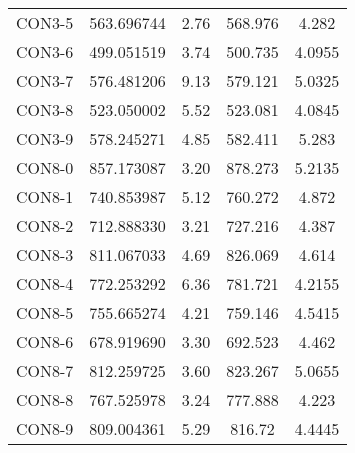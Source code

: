 \begin{table}[ht]
\begin{tabular}{c c c c c}
CON3-5 & 563.696744 & 2.76 & 568.976 & 4.282 \\
CON3-6 & 499.051519 & 3.74 & 500.735 & 4.0955 \\
CON3-7 & 576.481206 & 9.13 & 579.121 & 5.0325 \\
CON3-8 & 523.050002 & 5.52 & 523.081 & 4.0845 \\
CON3-9 & 578.245271 & 4.85 & 582.411 & 5.283 \\
CON8-0 & 857.173087 & 3.20 & 878.273 & 5.2135 \\
CON8-1 & 740.853987 & 5.12 & 760.272 & 4.872 \\
CON8-2 & 712.888330 & 3.21 & 727.216 & 4.387 \\
CON8-3 & 811.067033 & 4.69 & 826.069 & 4.614 \\
CON8-4 & 772.253292 & 6.36 & 781.721 & 4.2155 \\
CON8-5 & 755.665274 & 4.21 & 759.146 & 4.5415 \\
CON8-6 & 678.919690 & 3.30 & 692.523 & 4.462 \\
CON8-7 & 812.259725 & 3.60 & 823.267 & 5.0655 \\
CON8-8 & 767.525978 & 3.24 & 777.888 & 4.223 \\
CON8-9 & 809.004361 & 5.29 & 816.72 & 4.4445 \\
[1ex]\hline
\end{tabular}
\label{table:nonlin}
\end{table} \clearpage
